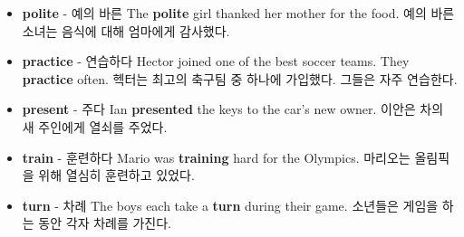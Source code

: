 \documentclass{article}
\begin{document}
\begin{addmargin}[1em]{1em}
\begin{itemize}
        \item \fontsize{12pt}{14pt}\selectfont \textbf{polite} - 예의 바른 \newline
        The \textbf{polite} girl thanked her mother for the food. \newline
        예의 바른 소녀는 음식에 대해 엄마에게 감사했다.
        
        \item \fontsize{12pt}{14pt}\selectfont \textbf{practice} - 연습하다 \newline
        Hector joined one of the best soccer teams. They \textbf{practice} often. \newline
        헥터는 최고의 축구팀 중 하나에 가입했다. 그들은 자주 연습한다.
        
        \item \fontsize{12pt}{14pt}\selectfont \textbf{present} - 주다 \newline
        Ian \textbf{presented} the keys to the car's new owner. \newline
        이안은 차의 새 주인에게 열쇠를 주었다.
        
        \item \fontsize{12pt}{14pt}\selectfont \textbf{train} - 훈련하다 \newline
        Mario was \textbf{training} hard for the Olympics. \newline
        마리오는 올림픽을 위해 열심히 훈련하고 있었다.
        
        \item \fontsize{12pt}{14pt}\selectfont \textbf{turn} - 차례 \newline
        The boys each take a \textbf{turn} during their game. \newline
        소년들은 게임을 하는 동안 각자 차례를 가진다.
    \end{itemize}
\end{addmargin}

\newpage

\end{document}
